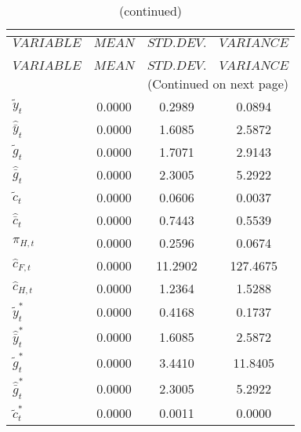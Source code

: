  
\begin{center}
\begin{longtable}{lccc} 
\caption{THEORETICAL MOMENTS}\\
 \label{Table:th_moments}\\
\toprule 
$VARIABLE             $	 & 	 $         MEAN$	 & 	 $    STD. DEV.$	 & 	 $     VARIANCE$\\
\midrule \endfirsthead 
\caption{(continued)}\\
 \toprule \\ 
$VARIABLE             $	 & 	 $         MEAN$	 & 	 $    STD. DEV.$	 & 	 $     VARIANCE$\\
\midrule \endhead 
\midrule \multicolumn{4}{r}{(Continued on next page)} \\ \bottomrule \endfoot 
\bottomrule \endlastfoot 
${\tilde y_t}         $	 & 	       0.0000	 & 	       0.2989	 & 	       0.0894 \\ 
${\hat {\bar y}_t}    $	 & 	       0.0000	 & 	       1.6085	 & 	       2.5872 \\ 
${\tilde g_t}         $	 & 	       0.0000	 & 	       1.7071	 & 	       2.9143 \\ 
${\hat {\bar g}_t}    $	 & 	       0.0000	 & 	       2.3005	 & 	       5.2922 \\ 
${\tilde c_t}         $	 & 	       0.0000	 & 	       0.0606	 & 	       0.0037 \\ 
${\hat {\bar c}_t}    $	 & 	       0.0000	 & 	       0.7443	 & 	       0.5539 \\ 
${\pi_{H,t}}          $	 & 	       0.0000	 & 	       0.2596	 & 	       0.0674 \\ 
${\hat c_{F,t}}       $	 & 	       0.0000	 & 	      11.2902	 & 	     127.4675 \\ 
${\hat c_{H,t}}       $	 & 	       0.0000	 & 	       1.2364	 & 	       1.5288 \\ 
${\tilde y_t^*}       $	 & 	       0.0000	 & 	       0.4168	 & 	       0.1737 \\ 
${\hat {\bar y}_t^*}  $	 & 	       0.0000	 & 	       1.6085	 & 	       2.5872 \\ 
${\tilde g_t^*}       $	 & 	       0.0000	 & 	       3.4410	 & 	      11.8405 \\ 
${\hat {\bar g}_t^*}  $	 & 	       0.0000	 & 	       2.3005	 & 	       5.2922 \\ 
${\tilde c_t^*}       $	 & 	       0.0000	 & 	       0.0011	 & 	       0.0000 \\ 

\end{longtable}
\end{center}
